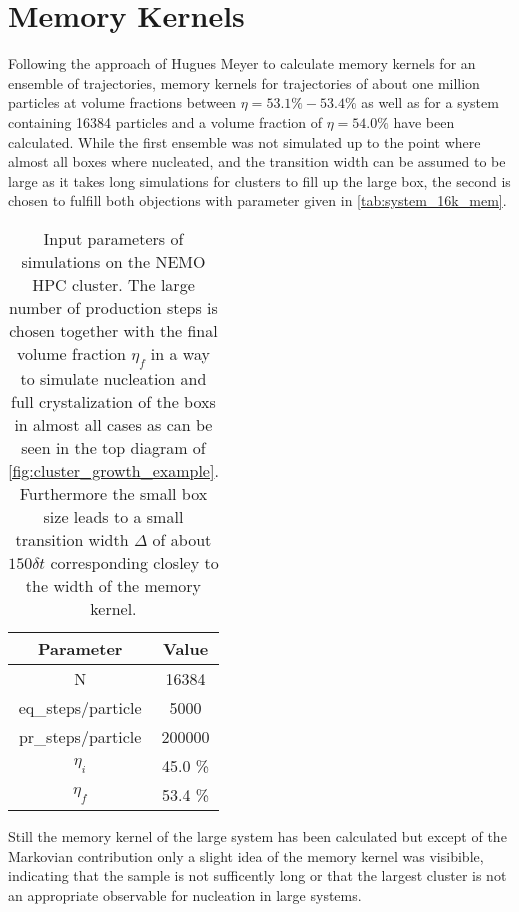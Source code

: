 \section{Memory Kernels}
\label{sec:memory_kernels}

Following the approach of Hugues Meyer to calculate memory kernels for an ensemble of trajectories\cite{Meyer2019a}, memory kernels for trajectories of about one million particles at volume fractions between $\eta = 53.1\% - 53.4\%$ as well as for a system containing 16384 particles and a volume fraction of $\eta = 54.0\% $ have been calculated. While the first ensemble was not simulated up to the point where almost all boxes where nucleated, and the transition width can be assumed to be large as it takes long simulations for clusters to fill up the large box, the second is chosen to fulfill both objections with parameter given in \autoref{tab:system_16k_mem}.\\

\begin{table}[ht]
\centering
\begin{tabular}{c|c}
Parameter & Value \\ \hline
N & 16384 \\
eq\_steps/particle & 5000 \\
pr\_steps/particle & 200000 \\
$\eta_i$ & 45.0 \% \\
$\eta_f$ & 53.4 \% \\
\end{tabular}
\caption[Simulation parameters of data production system with 16384 particles]{Input parameters of simulations on the NEMO HPC cluster. The large number of production steps is chosen together with the final volume fraction $\eta_f$ in a way to simulate nucleation and full crystalization of the boxs in almost all cases as can be seen in the top diagram of \autoref{fig:cluster_growth_example}. Furthermore the small box size leads to a small transition width $\Delta$ of about $150 \delta t$ corresponding closley to the width of the memory kernel.\cite{Meyer2021}} 
\label{tab:system_16k_mem}
\end{table}



Still the memory kernel of the large system has been calculated but except of the Markovian contribution only a slight idea of the memory kernel was visibible, indicating that the sample is not sufficently long or that the largest cluster is not an appropriate observable for nucleation in large systems.\\



